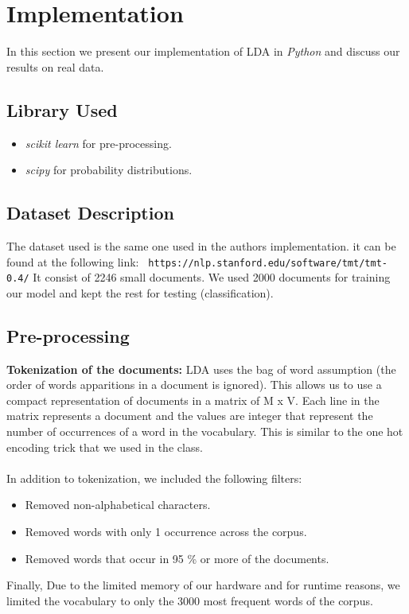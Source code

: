 \documentclass[11pt]{article}
\begin{document}
\section{Implementation}
In this section we present our implementation of LDA in \textit{Python} and discuss our results on real data. 
\subsection{Library Used}
	
    \begin{itemize}[noitemsep]
		\item \textit{scikit learn}  for pre-processing.
		\item \textit{scipy} for probability distributions.
 	\end{itemize}
\subsection{Dataset Description}
The dataset used is the same one used in the authors implementation. it can be found at the following link: \texttt{ https://nlp.stanford.edu/software/tmt/tmt-0.4/}
It consist of 2246 small documents. We used 2000 documents for training our model and kept the rest for testing (classification).
   
\subsection{Pre-processing}
\textbf{Tokenization of the documents:}  LDA uses the bag of word assumption (the order of words apparitions in a document is ignored). This allows us to use a compact representation of documents in a matrix of M x V.  Each line in the matrix represents a document and the values are integer that represent the number of occurrences of a word in the vocabulary. This is similar to the one hot encoding trick that we used in the class. \\
\\
In addition  to tokenization, we included the following filters: 
    \begin{itemize}[noitemsep]
   	    \item Removed non-alphabetical characters.
		\item Removed words with only 1 occurrence across the corpus.
		\item Removed words that occur in 95 \%  or more of the documents. 
	\end{itemize}
Finally, Due to the limited memory of our hardware and for runtime reasons, we limited the vocabulary to only the 3000 most frequent words of the corpus. 
\end{document}
